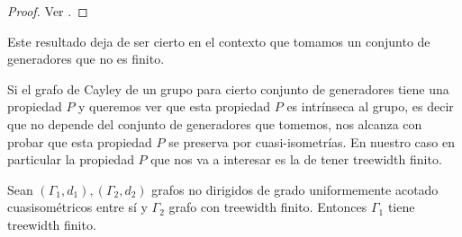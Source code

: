 \documentclass[tesis.tex]{subfiles}
\begin{document}
\begin{proof}
	Ver \cite[p.89]{loh2017geometric}.
\end{proof}

Este resultado deja de ser cierto en el contexto que tomamos un conjunto de generadores que no es finito.


Si el grafo de Cayley de un grupo para cierto conjunto de generadores tiene una propiedad $P$ y queremos ver que esta propiedad $P$ es intrínseca al grupo, es decir que no depende del conjunto de generadores que tomemos, nos alcanza con probar que esta propiedad $P$ se preserva por cuasi-isometrías.
En nuestro caso en particular la propiedad $P$ que nos va a interesar es la de tener treewidth finito.


\begin{prop} \label{treewidth-inv}
	Sean $(\Gamma_{1},d_{1}), (\Gamma_{2}, d_{2})$ grafos no dirigidos de grado uniformemente acotado cuasisométricos entre sí y $\Gamma_{2}$ grafo con treewidth finito.
	Entonces $\Gamma_{1}$ tiene treewidth finito.
\end{prop}
%
%	
%	
%	
%	
\end{document}
